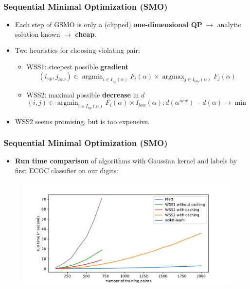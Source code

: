 \documentclass[12pt, compress]{beamer}
\newcommand{\titleC}{Sequential Minimal Optimization (SMO)}
\DeclareMathOperator{\argmax}{argmax}
\DeclareMathOperator{\argmin}{argmin}
\begin{document}
\begin{frame}
\frametitle{\titleC}
\begin{itemize}
	\item Each step of GSMO is only a (clipped) \textbf{\alert{one-dimensional QP}} $\rightarrow$ analytic solution known $\rightarrow$ \textbf{\alert{cheap}}.
	\item Two heuristics for choosing violating pair: \\
	\begin{itemize}
		\item WSS1: steepest possible \textbf{\alert{gradient}}
		\[
		(i_{up},j_{low}) \in \argmin_{i \in I_{up}(\alpha)}F_i(\alpha) \times \argmax_{j \in I_{low}(\alpha)}F_j(\alpha)
		\]
		\item WSS2: maximal possible \textbf{\alert{decrease}} in $d$
		\[
		(i,j) \in \argmin_{i \in I_{up}(\alpha)}F_i(\alpha) \times I_{low}(\alpha): d(\alpha^{new}) - d(\alpha) \rightarrow \min
		\]
		
	\end{itemize}
	\item WSS2 seems promising, but is too expensive.
\end{itemize}
\end{frame}

\begin{frame}
	\frametitle{\titleC}
	
		\begin{itemize}
		\item \textbf{\alert{Run time comparison}} of algorithms with Gaussian kernel and labels by first ECOC classifier on our digits:
		\end{itemize}

	\begin{figure}[h]
	\includegraphics[width=1\textwidth]{images_for_presentation/benchplot_gauss.pdf}
	\end{figure}

\end{frame}
\end{document}
